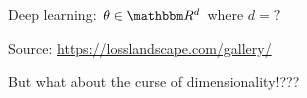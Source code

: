 \documentclass[
    xcolor={svgnames,dvipsnames},
    hyperref={colorlinks, citecolor=DeepPink4, linkcolor=DarkRed, urlcolor=DarkBlue}
    ]{beamer}  %
\newcommand{\1}{\mathbbm 1}
\newcommand{\RR}{\mathbbm R}
\begin{document}
\begin{frame}

    Deep learning: $\theta \in \RR^d$ where $d = ?$
    
    \begin{figure}
       \begin{center}
       \end{center}
    \end{figure}

    Source: \url{https://losslandscape.com/gallery/}

\end{frame}

\begin{frame}
    
    But what about the curse of dimensionality!???

\end{frame}
\end{document}
